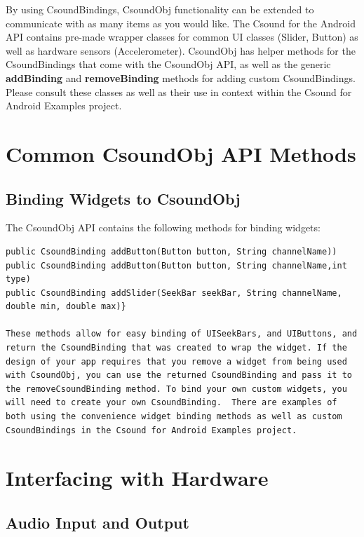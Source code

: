 \documentclass[11pt]{article}
\begin{document}
By using CsoundBindings, CsoundObj functionality can be extended to communicate with as many items as you would like. The Csound for the Android API contains pre-made wrapper classes for common UI classes (Slider, Button) as well as hardware sensors (Accelerometer).  CsoundObj has helper methods for the CsoundBindings that come with the CsoundObj API, as well as the generic \textbf{addBinding} and \textbf{removeBinding} methods for adding custom CsoundBindings. Please consult these classes as well as their use in context within the Csound for Android Examples project.



\section{Common CsoundObj API Methods}

\subsection{Binding Widgets to CsoundObj}

The CsoundObj API contains the following methods for binding widgets:

\begin{lstlisting}[caption=Methods for Widget Binding]
public CsoundBinding addButton(Button button, String channelName))
public CsoundBinding addButton(Button button, String channelName,int type)
public CsoundBinding addSlider(SeekBar seekBar, String channelName, double min, double max)}

These methods allow for easy binding of UISeekBars, and UIButtons, and return the CsoundBinding that was created to wrap the widget. If the design of your app requires that you remove a widget from being used with CsoundObj, you can use the returned CsoundBinding and pass it to the removeCsoundBinding method. To bind your own custom widgets, you will need to create your own CsoundBinding.  There are examples of both using the convenience widget binding methods as well as custom CsoundBindings in the Csound for Android Examples project.
\end{lstlisting}

\section{Interfacing with Hardware}
\subsection{Audio Input and Output}
\end{document}
